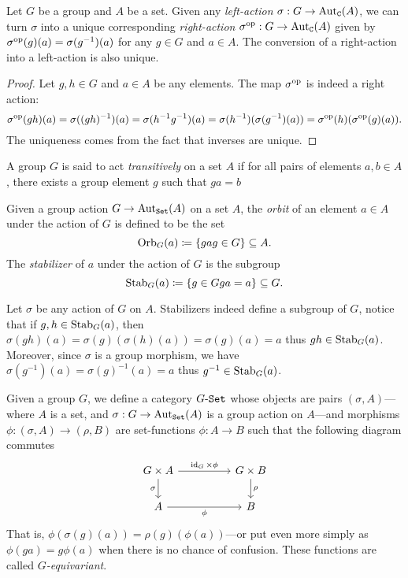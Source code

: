\begin{proposition}
\label{prop:left-and-right-actions}
Let \(G\) be a group and \(A\) be a set. Given any \emph{left-action}
\(\sigma: G \to \operatorname{Aut}_{\texttt C}(A)\), we can turn \(\sigma\) into a unique
corresponding \emph{right-action} \(\sigma^{\mathrm{op}}: G \to \operatorname{Aut}_{\texttt C}(A)\) given
by \(\sigma^{\mathrm{op}}(g)(a) = \sigma(g^{-1})(a)\) for any \(g \in G\) and
\(a \in A\). The conversion of a right-action into a left-action is also unique.
\end{proposition}

\begin{proof}
Let \(g, h \in G\) and \(a \in A\) be any elements. The map \(\sigma^{\mathrm{op}}\) is
indeed a right action:
\[
\sigma^{\mathrm{op}}(g h)(a)
= \sigma((gh)^{-1})(a)
= \sigma(h^{-1} g^{-1})(a)
= \sigma(h^{-1})(\sigma(g^{-1})(a))
= \sigma^{\mathrm{op}}(h)(\sigma^{\mathrm{op}}(g)(a)).
\]
The uniqueness comes from the fact that inverses are unique.
\end{proof}

\begin{definition}
\label{def:transitive-action}
A group \(G\) is said to act \emph{transitively} on a set \(A\) if for all pairs
of elements \(a, b \in A\), there exists a group element \(g\) such that
\(g a = b\)
\end{definition}

\begin{definition}
\label{def:orbit-and-stabilizer}
Given a group action \(G \to \operatorname{Aut}_{{\texttt{Set}}}(A)\) on a set \(A\), the \emph{orbit}
of an element \(a \in A\) under the action of \(G\) is defined to be the
set
\[
\operatorname{Orb}_G(a) \coloneq \{g a \relax g \in G\} \subseteq A.
\]
The \emph{stabilizer} of \(a\) under the action of \(G\) is the subgroup
\[
\operatorname{Stab}_G(a) \coloneq \{g \in G \relax g a = a\} \subseteq G.
\]
\end{definition}

Let \(\sigma\) be any action of \(G\) on \(A\). Stabilizers indeed define a
subgroup of \(G\), notice that if \(g, h \in \operatorname{Stab}_G(a)\), then
\(\sigma(g h)(a) = \sigma(g)(\sigma(h)(a)) = \sigma(g)(a) = a\) thus
\(g h \in \operatorname{Stab}_G(a)\). Moreover, since \(\sigma\) is a group morphism, we have
\(\sigma(g^{-1})(a) = \sigma(g)^{-1}(a) = a\) thus \(g^{-1} \in
\operatorname{Stab}_G(a)\).

\begin{definition}
\label{def:G-set-category}
Given a group \(G\), we define a category \({{G}\text{-}{\texttt{Set}}}\) whose objects are pairs
\((\sigma, A)\)---where \(A\) is a set, and \(\sigma: G \to \operatorname{Aut}_{{\texttt{Set}}}(A)\)
is a group action on \(A\)---and morphisms \(\phi: (\sigma, A) \to (\rho, B)\)
are set-functions \(\phi: A \to B\) such that the following diagram commutes
\[
\begin{tikzcd}
G \times A \ar[d, "\sigma"'] \ar[rr, "\Id_G \times \phi"]
&&G \times B \ar[d, "\rho"] \\
A \ar[rr, "\phi"'] &&B
\end{tikzcd}
\]
That is, \(\phi(\sigma(g)(a)) = \rho(g)(\phi(a))\)---or put even more simply
as \(\phi(g a) = g \phi(a)\) when there is no chance of confusion. These
functions are called \emph{\(G\)-equivariant}.
\end{definition}


